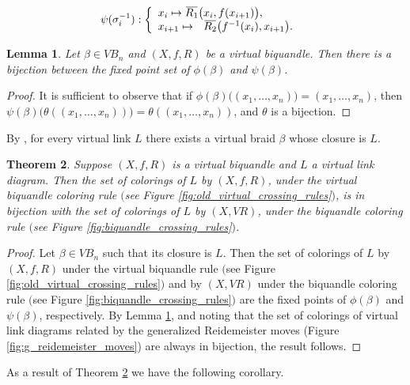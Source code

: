 \documentclass[11pt, reqno]{amsart}
\newtheorem{theorem}{Theorem}[section]
\newtheorem{lemma}[theorem]{Lemma}
\theoremstyle{definition}
\newcommand{\overbar}[1]{\mkern 1.5mu\overline{\mkern-1.5mu#1\mkern-1.5mu}\mkern 1.5mu}
\begin{document}
\begin{align*}
&\psi(\sigma_i^{-1}) :
	\left\{	\begin{array}{l}
		x_i \mapsto  \overbar{R_1}\big(x_i,f(x_{i+1})\big), \\
		x_{i+1} \mapsto ~~\overbar{R_2}\big(f^{-1}(x_i),x_{i+1}\big). \\
	\end{array}
\right.
\end{align*}

\begin{lemma}\label{lem:number_of_colorings_are_same}
Let $\beta \in VB_n$ and $(X,f,R)$ be a virtual biquandle. Then there is a bijection between the fixed point set of $\phi(\beta)$ and $\psi(\beta)$.
\end{lemma}
\begin{proof}
It is sufficient to observe that if $\phi(\beta)\big( (x_1, \ldots, x_n) \big) =(x_1, \ldots, x_n)$, then $\psi(\beta) \big(\theta( (x_1, \ldots, x_n) ) \big) = \theta( (x_1, \ldots, x_n) )$, and $\theta$ is a bijection.
\end{proof}

By \cite{MR2351010}, for every virtual link $L$ there exists a virtual braid $\beta$ whose closure is $L$.

\begin{theorem}\label{thm:number_of_colorings_are_same}
Suppose $(X,f,R)$ is a virtual biquandle and $L$ a virtual link diagram. Then the set of colorings of $L$ by $(X,f,R)$, under the virtual biquandle coloring rule $($see Figure \ref{fig:old_virtual_crossing_rules}$)$, is in bijection with the set of colorings of $L$ by $(X,VR)$, under the biquandle coloring rule $($see Figure \ref{fig:biquandle_crossing_rules}$)$.
\end{theorem}
\begin{proof}
Let $\beta \in VB_n$ such that its closure is $L$. Then the set of colorings of $L$ by $(X,f,R)$ under the virtual biquandle rule $($see Figure \ref{fig:old_virtual_crossing_rules}$)$ and by $(X, VR)$ under the biquandle coloring rule $($see Figure \ref{fig:biquandle_crossing_rules}$)$ are the fixed points of $\phi(\beta)$ and $\psi(\beta)$, respectively. By Lemma \ref{lem:number_of_colorings_are_same}, and noting that the set of colorings of virtual link diagrams related by the generalized Reidemeister moves (Figure \ref{fig:g_reidemeister_moves}) are always in bijection, the result follows.
\end{proof}

As a result of Theorem \ref{thm:number_of_colorings_are_same} we have the following corollary.
\end{document}
